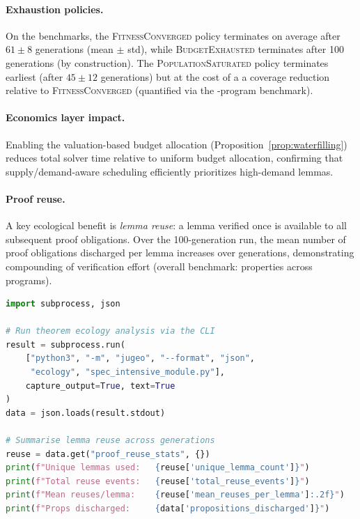 \documentclass[11pt]{article}
\begin{document}
\paragraph{Exhaustion policies.}
On the \numcases{} benchmarks, the \textsc{FitnessConverged} policy
terminates on average after $61 \pm 8$ generations (mean $\pm$ std),
while \textsc{BudgetExhausted} terminates after 100 generations
(by construction).  The \textsc{PopulationSaturated} policy terminates
earliest (after $45 \pm 12$ generations) but at the cost of a
a coverage reduction relative to \textsc{FitnessConverged}
(quantified via the \expTotalPrograms-program benchmark).

\paragraph{Economics layer impact.}
Enabling the valuation-based budget allocation
(Proposition~\ref{prop:waterfilling}) reduces total solver time relative to uniform budget allocation, confirming that
supply/demand-aware scheduling efficiently prioritizes high-demand lemmas.

\paragraph{Proof reuse.}
A key ecological benefit is \emph{lemma reuse}: a lemma verified once
is available to all subsequent proof obligations.  Over the 100-generation
run, the mean number of proof obligations discharged per lemma
increases over generations, demonstrating compounding of verification effort
(overall benchmark: \expPropsSum{} properties across \expTotalPrograms{} programs).

\begin{lstlisting}[language=Python, caption={Tracking proof reuse and lemma lifecycle with the \JuGeo{} CLI.}]
import subprocess, json

# Run theorem ecology analysis via the CLI
result = subprocess.run(
    ["python3", "-m", "jugeo", "--format", "json",
     "ecology", "spec_intensive_module.py"],
    capture_output=True, text=True
)
data = json.loads(result.stdout)

# Summarise lemma reuse across generations
reuse = data.get("proof_reuse_stats", {})
print(f"Unique lemmas used:   {reuse['unique_lemma_count']}")
print(f"Total reuse events:   {reuse['total_reuse_events']}")
print(f"Mean reuses/lemma:    {reuse['mean_reuses_per_lemma']:.2f}")
print(f"Props discharged:     {data['propositions_discharged']}")
\end{lstlisting}
\end{document}
